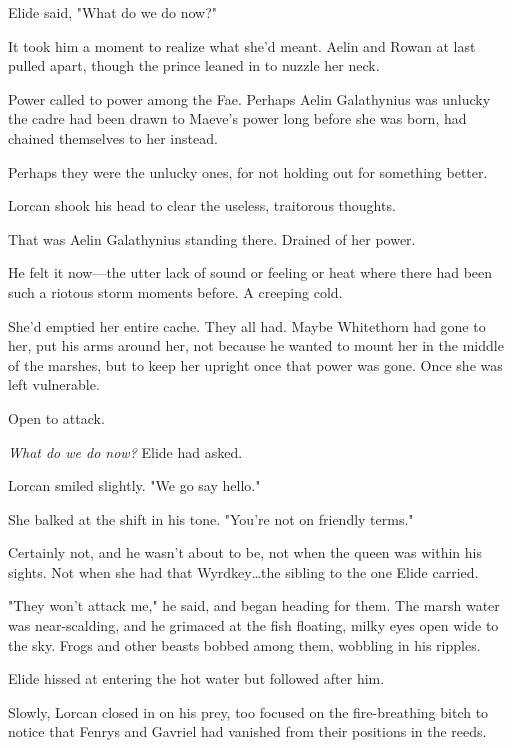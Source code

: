 Elide said, "What do we do now?"

It took him a moment to realize what she'd meant.
Aelin and Rowan at last pulled apart, though the prince leaned in to nuzzle her neck.

Power called to power among the Fae.
Perhaps Aelin Galathynius was unlucky the cadre had been drawn to Maeve's power long before she was born, had chained themselves to her instead.

Perhaps they were the unlucky ones, for not holding out for something better.

Lorcan shook his head to clear the useless, traitorous thoughts.

That was Aelin Galathynius standing there.
Drained of her power.

He felt it now---the utter lack of sound or feeling or heat where there had been such a riotous storm moments before.
A creeping cold.

She'd emptied her entire cache.
They all had.
Maybe Whitethorn had gone to her, put his arms around her, not because he wanted to mount her in the middle of the marshes, but to keep her upright once that power was gone.
Once she was left vulnerable.

Open to attack.

\emph{What do we do now?} Elide had asked.

Lorcan smiled slightly.
"We go say hello."

She balked at the shift in his tone.
"You're not on friendly terms."

Certainly not, and he wasn't about to be, not when the queen was within his sights.
Not when she had that Wyrdkey\ldots the sibling to the one Elide carried.

"They won't attack me," he said, and began heading for them.
The marsh water was near-scalding, and he grimaced at the fish floating, milky eyes open wide to the sky.
Frogs and other beasts bobbed among them, wobbling in his ripples.

Elide hissed at entering the hot water but followed after him.

Slowly, Lorcan closed in on his prey, too focused on the fire-breathing bitch to notice that Fenrys and Gavriel had vanished from their positions in the reeds.
